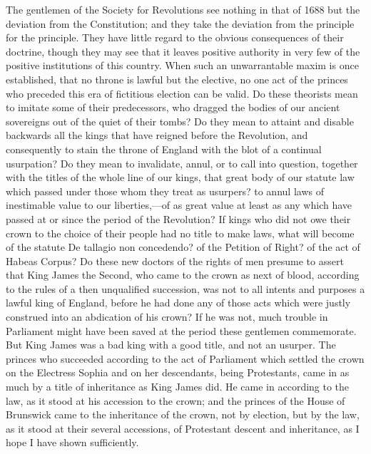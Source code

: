 The gentlemen of the Society for Revolutions see nothing in that of 1688 but the deviation from the Constitution; and they take the deviation from the principle for the principle. They have little regard to the obvious consequences of their doctrine, though they may see that it leaves positive authority in very few of the positive institutions of this country. When such an unwarrantable maxim is once established, that no throne is lawful but the elective, no one act of the princes who preceded this era of fictitious election can be valid. Do these theorists mean to imitate some of their predecessors, who dragged the bodies of our ancient sovereigns out of the quiet of their tombs? Do they mean to attaint and disable backwards all the kings that have reigned before the Revolution, and consequently to stain the throne of England with the blot of a continual usurpation? Do they mean to invalidate, annul, or to call into question, together with the titles of the whole line of our kings, that great body of our statute law which passed under those whom they treat as usurpers? to annul laws of inestimable value to our liberties,—of as great value at least as any which have passed at or since the period of the Revolution? If kings who did not owe their crown to the choice of their people had no title to make laws, what will become of the statute De tallagio non concedendo? of the Petition of Right? of the act of Habeas Corpus? Do these new doctors of the rights of men presume to assert that King James the Second, who came to the crown as next of blood, according to the rules of a then unqualified succession, was not to all intents and purposes a lawful king of England, before he had done any of those acts which were justly construed into an abdication of his crown? If he was not, much trouble in Parliament might have been saved at the period these gentlemen commemorate. But King James was a bad king with a good title, and not an usurper. The princes who succeeded according to the act of Parliament which settled the crown on the Electress Sophia and on her descendants, being Protestants, came in as much by a title of inheritance as King James did. He came in according to the law, as it stood at his accession to the crown; and the princes of the House of Brunswick came to the inheritance of the crown, not by election, but by the law, as it stood at their several accessions, of Protestant descent and inheritance, as I hope I have shown sufficiently.

